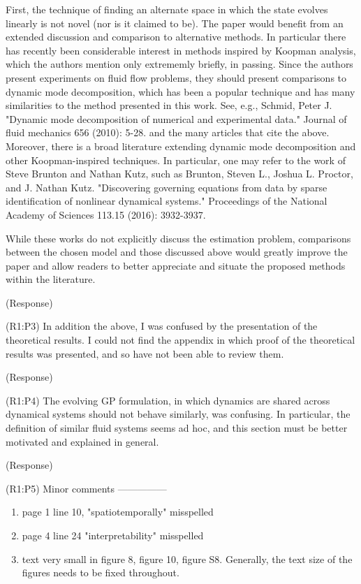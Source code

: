 \documentclass{letter}
\begin{document}
First, the technique of finding an alternate space in which the state
evolves linearly is not novel (nor is it claimed to be). The paper
would benefit from an extended discussion and comparison to alternative
methods. In particular there has recently been considerable interest in
methods inspired by Koopman analysis, which the authors mention only
extrememly briefly, in passing. Since the authors present experiments
on fluid flow problems, they should present comparisons to dynamic mode
decomposition, which has been a popular technique and has many
similarities to the method presented in this work. See, e.g.,
Schmid, Peter J. "Dynamic mode decomposition of numerical and
experimental data." Journal of fluid mechanics 656 (2010): 5-28.
and the many articles that cite the above. Moreover, there is a broad
literature extending dynamic mode decomposition and other
Koopman-inspired techniques. In particular, one may refer to the work
of Steve Brunton and Nathan Kutz, such as 
Brunton, Steven L., Joshua L. Proctor, and J. Nathan Kutz. "Discovering
governing equations from data by sparse identification of nonlinear
dynamical systems." Proceedings of the National Academy of Sciences
113.15 (2016): 3932-3937.

While these works do not explicitly discuss the estimation problem,
comparisons between the chosen model and those discussed above would
greatly improve the paper and allow readers to better appreciate and
situate the proposed methods within the literature. 

{\color{red}(Response)}

{\color{red}(R1:P3)} In addition the above, I was confused by the presentation of the
theoretical results. I could not find the appendix in which proof of
the theoretical results was presented, and so have not been able to
review them. 

{\color{red}(Response)}

{\color{red}(R1:P4)} The evolving GP formulation, in which dynamics are shared across
dynamical systems should not behave similarly, was confusing. In
particular, the definition of similar fluid systems seems ad hoc, and
this section must be better motivated and explained in general. 

{\color{red}(Response)}


{\color{red}(R1:P5)} Minor comments
---------------
\begin{enumerate}
\item page 1 line 10, "spatiotemporally" misspelled 
\item page 4 line 24 "interpretability" misspelled 
\item text very small in figure 8, figure 10, figure S8. Generally, the
text size of the figures needs to be fixed throughout. 
\end{enumerate}
\end{document}
